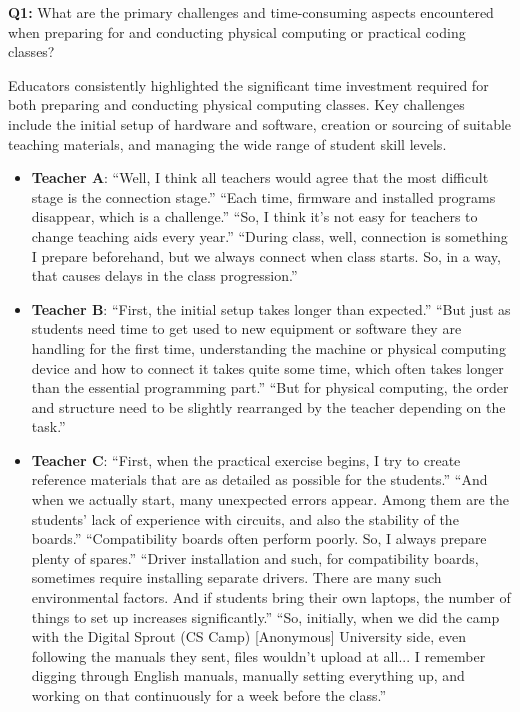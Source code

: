\documentclass{article} %
\begin{document}
\textbf{Q1:} What are the primary challenges and time-consuming aspects encountered when preparing for and conducting physical computing or practical coding classes?
\begin{summarybox}
Educators consistently highlighted the significant time investment required for both preparing and conducting physical computing classes.
Key challenges include the initial setup of hardware and software, creation or sourcing of suitable teaching materials, and managing the wide range of student skill levels.
    \begin{itemize}[itemsep=0em, topsep=0.5em, labelsep=0.5em, leftmargin=0.5em]
    \item \textbf{Teacher A}: ``Well, I think all teachers would agree that the most difficult stage is the connection stage.''  ``Each time, firmware and installed programs disappear, which is a challenge.''  ``So, I think it's not easy for teachers to change teaching aids every year.''  ``During class, well, connection is something I prepare beforehand, but we always connect when class starts. So, in a way, that causes delays in the class progression.''
    \item \textbf{Teacher B}: ``First, the initial setup takes longer than expected.''  ``But just as students need time to get used to new equipment or software they are handling for the first time, understanding the machine or physical computing device and how to connect it takes quite some time, which often takes longer than the essential programming part.''  ``But for physical computing, the order and structure need to be slightly rearranged by the teacher depending on the task.'' 
    \item \textbf{Teacher C}: ``First, when the practical exercise begins, I try to create reference materials that are as detailed as possible for the students.''  ``And when we actually start, many unexpected errors appear. Among them are the students' lack of experience with circuits, and also the stability of the boards.''  ``Compatibility boards often perform poorly. So, I always prepare plenty of spares.''  ``Driver installation and such, for compatibility boards, sometimes require installing separate drivers. There are many such environmental factors. And if students bring their own laptops, the number of things to set up increases significantly.''  ``So, initially, when we did the camp with the Digital Sprout (CS Camp) [Anonymous] University side, even following the manuals they sent, files wouldn't upload at all... I remember digging through English manuals, manually setting everything up, and working on that continuously for a week before the class.''

\end{itemize}
\end{summarybox}
\end{document}
